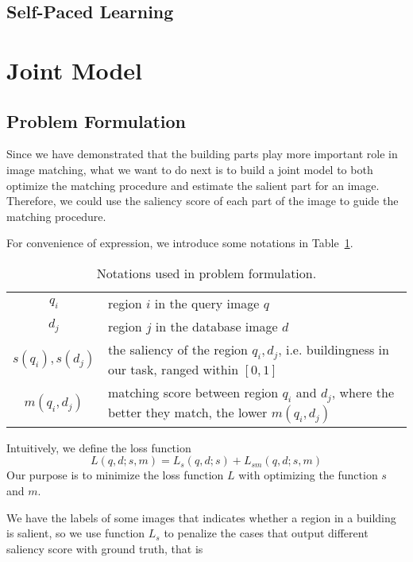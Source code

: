 \documentclass[10pt,twocolumn,letterpaper]{article}
\begin{document}
\subsection{Self-Paced Learning}

\section{Joint Model}
\subsection{Problem Formulation}
\par
Since we have demonstrated that the building parts play more important role in image matching, what we want to do next is to build a joint model to both optimize the matching procedure and estimate the salient part for an image. Therefore, we could use the saliency score of each part of the image to guide the matching procedure.
\par
For convenience of expression, we introduce some notations in Table~\ref{table1}. 
\begin{table}
\begin{center}
\begin{tabular}{|c|p{}|}
\hline
$q_i$ & region $i$ in the query image $q$\\[0.2cm]
$d_j$ & region $j$ in the database image $d$\\[0.2cm]
$s(q_i), s(d_j)$ & the saliency of the region $q_i, d_j$, i.e. buildingness in our
task, ranged within $[0,1]$ \\[0.2cm]
$m(q_i, d_j)$ & matching score between region $q_i$ and $d_j$, where the better they match, the lower $m(q_i,d_j)$\\[0.2cm]
\hline
\end{tabular}
\end{center}
\caption{\label{table1}Notations used in problem formulation.}
\end{table}
Intuitively, we define the loss function
\begin{equation}\label{eq1}
L(q,d; s,m) = L_s(q,d; s) + L_{sm}(q,d;s,m) 
\end{equation}
Our purpose is to minimize the loss function $L$ with optimizing the function $s$ and $m$.
\par
We have the labels of some images that indicates whether a region in a building is salient, so we use function $L_s$ to penalize the cases that output different saliency score with ground truth, that is
\end{document}
